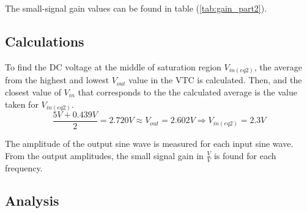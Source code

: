 The small-signal gain values can be found in table (\ref{tab:gain_part2}).

\subsection{Calculations}

\FloatBarrier

\begin{table}[h!]
	\centering
	\caption{Figure (\ref{fig:part2_vtc}) Data}
	\label{tab:part2_vtc}
\end{table}

\FloatBarrier

To find the DC voltage at the middle of saturation region $V_{in(eq2)}$, the average from the highest and lowest $V_{out}$ value in the VTC is calculated.
Then, and the closest value of $V_{in}$ that corresponds to the the calculated average is the value taken for $V_{in(eq2)}$. \\

\begin{equation}
	\label{eq:v_in_eq2}
	\frac{5 V + 0.439 V}{2} = 2.720 V \approx V_{out} = 2.602 V \Rightarrow V_{in(eq2)} = 2.3 V
\end{equation}

The amplitude of the output sine wave is measured for each input sine wave. 
From the output amplitudes, the small signal gain in $\frac{V}{V}$ is found for each frequency.

\FloatBarrier

\begin{table}[h!]
	\centering
	\caption{Gain of Common Source Amplifier}
	\label{tab:gain_part2}
\end{table}

\FloatBarrier

\begin{table}[h!]
	\centering
	\caption{Gain of Common Source Amplifier with $10$ \si{\milli\volt} Higher Bias}
	\label{tab:gain_part2}
\end{table}

\FloatBarrier

\subsection{Analysis}

\FloatBarrier

